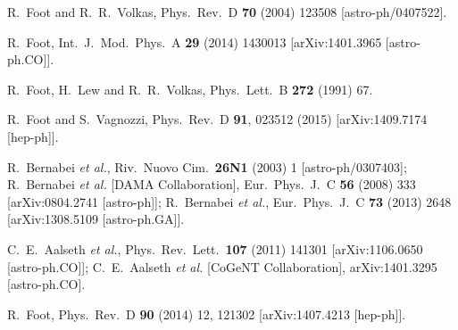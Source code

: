 \documentclass[12pt]{article}
\begin{document}
\vskip 0.2cm
\noindent


\begin{thebibliography}{999}

  R.~Foot and R.~R.~Volkas,
  Phys.\ Rev.\ D {\bf 70} (2004) 123508
  [astro-ph/0407522].

  R.~Foot,
  Int.\ J.\ Mod.\ Phys.\ A {\bf 29} (2014) 1430013
  [arXiv:1401.3965 [astro-ph.CO]].
  
  R.~Foot, H.~Lew and R.~R.~Volkas,
  Phys.\ Lett.\ B {\bf 272} (1991) 67.

  R.~Foot and S.~Vagnozzi,
  Phys.\ Rev.\ D {\bf 91}, 023512 (2015)
  [arXiv:1409.7174 [hep-ph]].
  
  R.~Bernabei {\it et al.},
  Riv.\ Nuovo Cim.\  {\bf 26N1} (2003) 1
  [astro-ph/0307403];
  R.~Bernabei {\it et al.}  [DAMA Collaboration],
  Eur.\ Phys.\ J.\ C {\bf 56} (2008) 333
  [arXiv:0804.2741 [astro-ph]];
  R.~Bernabei {\it et al.},
  Eur.\ Phys.\ J.\ C {\bf 73} (2013) 2648
  [arXiv:1308.5109 [astro-ph.GA]].
  
  C.~E.~Aalseth {\it et al.},
  Phys.\ Rev.\ Lett.\  {\bf 107} (2011) 141301
  [arXiv:1106.0650 [astro-ph.CO]];
  C.~E.~Aalseth {\it et al.}  [CoGeNT Collaboration],
  arXiv:1401.3295 [astro-ph.CO].
  
  R.~Foot,
  Phys.\ Rev.\ D {\bf 90} (2014) 12,  121302
  [arXiv:1407.4213 [hep-ph]].
  

\end{thebibliography}
\end{document}
